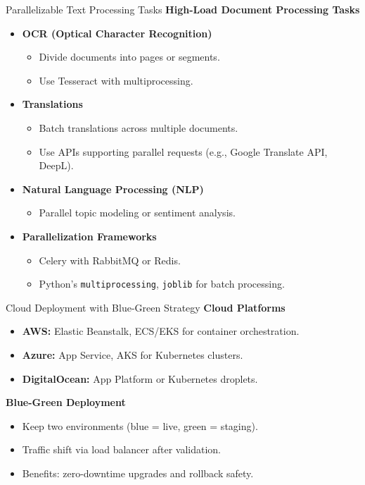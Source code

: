 \documentclass[notes]{beamer}
\begin{document}
{\begin{frame}{Parallelizable Text Processing Tasks}
    \textbf{High-Load Document Processing Tasks}
    \begin{itemize}
        \item \textbf{OCR (Optical Character Recognition)}
        \begin{itemize}
            \item Divide documents into pages or segments.
            \item Use Tesseract with multiprocessing.
        \end{itemize}
        \item \textbf{Translations}
        \begin{itemize}
            \item Batch translations across multiple documents.
            \item Use APIs supporting parallel requests (e.g., Google Translate API, DeepL).
        \end{itemize}
        \item \textbf{Natural Language Processing (NLP)}
        \begin{itemize}
            \item Parallel topic modeling or sentiment analysis.
        \end{itemize}
        \item \textbf{Parallelization Frameworks}
        \begin{itemize}
            \item Celery with RabbitMQ or Redis.
            \item Python's \texttt{multiprocessing}, \texttt{joblib} for batch processing.
        \end{itemize}
    \end{itemize}
\end{frame}

\begin{frame}{Cloud Deployment with Blue-Green Strategy}
    \textbf{Cloud Platforms}
    \begin{itemize}
        \item \textbf{AWS:} Elastic Beanstalk, ECS/EKS for container orchestration.
        \item \textbf{Azure:} App Service, AKS for Kubernetes clusters.
        \item \textbf{DigitalOcean:} App Platform or Kubernetes droplets.
    \end{itemize}
    \textbf{Blue-Green Deployment}
    \begin{itemize}
        \item Keep two environments (blue = live, green = staging).
        \item Traffic shift via load balancer after validation.
        \item Benefits: zero-downtime upgrades and rollback safety.
    \end{itemize}
\end{frame}

}
\end{document}
